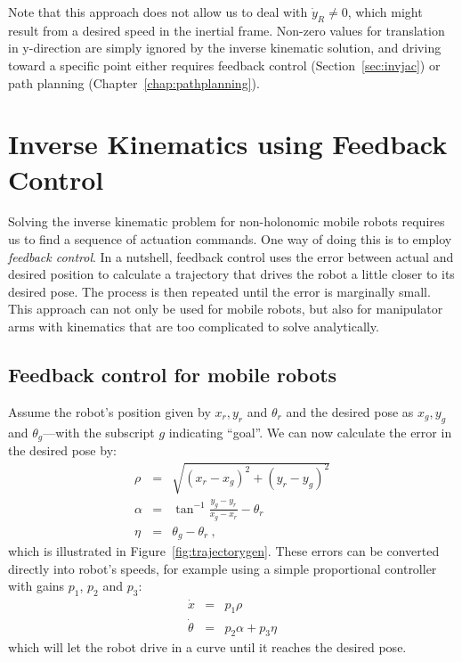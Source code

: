 Note that this approach does not allow us to deal with $\dot{y}_R \neq 0$, which might result from a desired speed in the inertial frame. Non-zero values for translation in y-direction are simply ignored by the inverse kinematic solution, and driving toward a specific point either requires feedback control (Section~\ref{sec:invjac}) or path planning (Chapter~\ref{chap:pathplanning}).

\section{Inverse Kinematics using Feedback Control}\label{sec:kinematics:inverse:feedbackcontrol}

Solving the inverse kinematic problem for non-holonomic mobile robots requires us to find a sequence of actuation commands.
One way of doing this is to employ \emph{feedback control}.
In a nutshell, feedback control uses the error between actual and desired position to calculate a trajectory that drives the robot a little closer to its desired pose. The process is then repeated until the error is marginally small.
This approach can not only be used for mobile robots, but also for manipulator arms with kinematics that are too complicated to solve analytically.

\subsection{Feedback control for mobile robots}\label{sec:fbmobile}

Assume the robot's position given by $x_r, y_r$ and $\theta_r$ and the desired pose as $x_g, y_g$ and $\theta_g$---with the subscript $g$ indicating ``goal''.
We can now calculate the error in the desired pose by:
\begin{eqnarray}
\rho  &=& \sqrt{(x_r-x_g)^2+(y_r-y_g)^2} \nonumber \\
\alpha&=& \tan^{-1}{\frac{y_g-y_r}{x_g-x_r}}-\theta_r \\
\eta  &=& \theta_g-\theta_r\ , \nonumber
\end{eqnarray}
which is illustrated in Figure~\ref{fig:trajectorygen}.
These errors can be converted directly into robot's speeds, for example using a simple proportional controller with gains $p_1$, $p_2$ and $p_3$:
\begin{eqnarray}
\dot{x} &=& p_1 \rho\\
\dot{\theta} &=& p_2 \alpha + p_3 \eta
\end{eqnarray}
which will let the robot drive in a curve until it reaches the desired pose.

